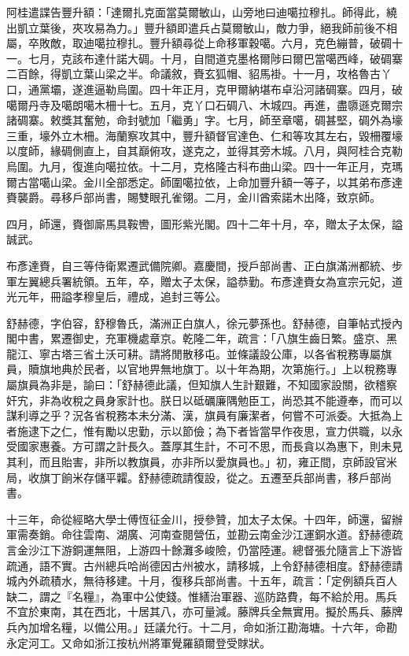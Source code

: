 \begin{pinyinscope}
阿桂遣諜告豐升額：「達爾扎克面當莫爾敏山，山旁地曰迪噶拉穆扎。師得此，繞出凱立葉後，夾攻易為力。」豐升額即遣兵占莫爾敏山，敵力爭，絕我師前後不相屬，卒敗敵，取迪噶拉穆扎。豐升額尋從上命移軍穀噶。六月，克色繃普，破碉十一。七月，克該布達什諾大碉。十月，自間道克墨格爾陟曰爾巴當噶西峰，破碉寨二百餘，得凱立葉山梁之半。命議敘，賚玄狐帽、貂馬褂。十一月，攻格魯古丫口，通黨壩，遂進逼勒烏圍。四十年正月，克甲爾納堪布卓沿河諸碉寨。四月，破噶爾丹寺及噶朗噶木柵十七。五月，克丫口石碉八、木城四。再進，盡隳遜克爾宗諸碉寨。敕獎其奮勉，命封號加「繼勇」字。七月，師至章噶，碉甚堅，碉外為壕三重，壕外立木柵。海蘭察攻其中，豐升額督官達色、仁和等攻其左右，毀柵覆壕以度師，緣碉側直上，自其巔俯攻，遂克之，並得其旁木城。八月，與阿桂合克勒烏圍。九月，復進向噶拉依。十二月，克格隆古科布曲山梁。四十一年正月，克瑪爾古當噶山梁。金川全部悉定。師圍噶拉依，上命加豐升額一等子，以其弟布彥達賚襲爵。尋移戶部尚書，賜雙眼孔雀翎。二月，金川酋索諾木出降，致京師。

四月，師還，賚御廝馬具鞍轡，圖形紫光閣。四十二年十月，卒，贈太子太保，謚誠武。

布彥達賚，自三等侍衛累遷武備院卿。嘉慶間，授戶部尚書、正白旗滿洲都統、步軍左翼總兵署統領。五年，卒，贈太子太保，謚恭勤。布彥達賚女為宣宗元妃，道光元年，冊謚孝穆皇后，禮成，追封三等公。

舒赫德，字伯容，舒穆魯氏，滿洲正白旗人，徐元夢孫也。舒赫德，自筆帖式授內閣中書，累遷御史，充軍機處章京。乾隆二年，疏言：「八旗生齒日繁。盛京、黑龍江、寧古塔三省土沃可耕。請將閒散移屯。並條議設公庫，以各省稅務專屬旗員，贖旗地典於民者，以官地畀無地旗丁。以十年為期，次第施行。」上以稅務專屬旗員為非是，諭曰：「舒赫德此議，但知旗人生計艱難，不知國家設關，欲稽察奸宄，非為收稅之員身家計也。朕日以砥礪廉隅勉臣工，尚恐其不能遵奉，而可以謀利導之乎？況各省稅務本未分滿、漢，旗員有廉潔者，何嘗不可派委。大抵為上者施逮下之仁，惟有勵以忠勤，示以節儉；為下者皆當早作夜思，宣力供職，以永受國家惠養。方可謂之計長久。蓋厚其生計，不可不思，而長貪以為惠下，則未見其利，而且貽害，非所以教旗員，亦非所以愛旗員也。」初，雍正間，京師設官米局，收旗丁餉米存儲平糶。舒赫德疏請復設，從之。五遷至兵部尚書，移戶部尚書。

十三年，命從經略大學士傅恆征金川，授參贊，加太子太保。十四年，師還，留辦軍需奏銷。命往雲南、湖廣、河南查閱營伍，並勘云南金沙江運銅水道。舒赫德疏言金沙江下游銅運無阻，上游四十餘灘多峻險，仍當陸運。總督張允隨言上下游皆疏通，語不實。古州總兵哈尚德因古州被水，請移城，上令舒赫德相度。舒赫德請城內外疏積水，無待移建。十月，復移兵部尚書。十五年，疏言：「定例額兵百人缺二，謂之『名糧』，為軍中公使錢。惟繕治軍器、巡防路費，每不給於用。馬兵不宜於東南，其在西北，十居其八，亦可量減。藤牌兵全無實用。擬於馬兵、藤牌兵內加增名糧，以備公用。」廷議允行。十二月，命如浙江勘海塘。十六年，命勘永定河工。又命如浙江按杭州將軍覺羅額爾登受賕狀。


\end{pinyinscope}
